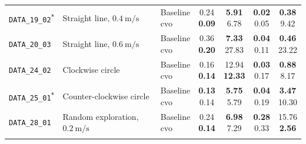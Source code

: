 \documentclass[report.tex]{subfiles}
\begin{document}
\begin{table}[!htbp]
\begin{tabularx}{\textwidth}{
            >{\raggedright\arraybackslash}m{1.55cm}
            >{\raggedright\arraybackslash}X
            l
            cccc
        }
            \texttt{DATA\_19\_02\textsuperscript{*}}
            & Straight line, $0.4~\mathrm{m/s}$
            & \makecell[l]{Baseline\\\gls{cvo}}
            & \makecell{0.24\\\textbf{0.09}}
            & \makecell{\textbf{5.91}\\6.78}
            & \makecell{\textbf{0.02}\\0.05}
            & \makecell{\textbf{0.38}\\9.42} \\
            \addlinespace

            \texttt{DATA\_20\_03}
            & Straight line, $0.6~\mathrm{m/s}$
            & \makecell[l]{Baseline\\\gls{cvo}}
            & \makecell{0.36\\\textbf{0.20}}
            & \makecell{\textbf{7.33}\\27.83}
            & \makecell{\textbf{0.04}\\0.11}
            & \makecell{\textbf{0.46}\\23.22} \\
            \addlinespace

            \texttt{DATA\_24\_02}
            & Clockwise circle
            & \makecell[l]{Baseline\\\gls{cvo}}
            & \makecell{0.16\\\textbf{0.14}}
            & \makecell{12.94\\\textbf{12.33}}
            & \makecell{\textbf{0.03}\\0.17}
            & \makecell{\textbf{0.88}\\8.17} \\
            \addlinespace

            \texttt{DATA\_25\_01\textsuperscript{*}}
            & Counter-clockwise circle
            & \makecell[l]{Baseline\\\gls{cvo}}
            & \makecell{\textbf{0.13}\\0.14}
            & \makecell{\textbf{5.75}\\5.79}
            & \makecell{\textbf{0.04}\\0.19}
            & \makecell{\textbf{3.47}\\10.30} \\
            \addlinespace

            \texttt{DATA\_28\_01}
            & Random exploration, $0.2~\mathrm{m/s}$
            & \makecell[l]{Baseline\\\gls{cvo}}
            & \makecell{0.24\\\textbf{0.14}}
            & \makecell{\textbf{6.98}\\7.29}
            & \makecell{\textbf{0.28}\\0.33}
            & \makecell{15.76\\\textbf{2.56}} \\
            \addlinespace


\end{tabularx}
\end{table}
\end{document}
